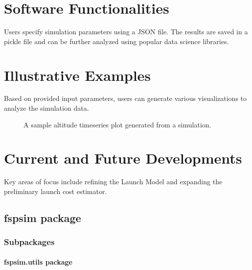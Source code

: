\documentclass[letterpaper,10pt,english]{sphinxmanual}
\begin{document}
\chapter{Software Functionalities}
\label{\detokenize{index:software-functionalities}}
\sphinxAtStartPar
Users specify simulation parameters using a JSON file. The results are saved in a pickle file and can be further analyzed using popular data science libraries.


\chapter{Illustrative Examples}
\label{\detokenize{index:illustrative-examples}}
\sphinxAtStartPar
Based on provided input parameters, users can generate various visualizations to analyze the simulation data.

\begin{figure}[htbp]
\centering
\capstart

\noindent{}
\caption{A sample altitude time\sphinxhyphen{}series plot generated from a simulation.}\label{\detokenize{index:id2}}\end{figure}


\chapter{Current and Future Developments}
\label{\detokenize{index:current-and-future-developments}}
\sphinxAtStartPar
Key areas of focus include refining the Launch Model and expanding the preliminary launch cost estimator.

\sphinxstepscope


\section{fspsim package}
\label{\detokenize{fspsim:fspsim-package}}\label{\detokenize{fspsim::doc}}

\subsection{Subpackages}
\label{\detokenize{fspsim:subpackages}}
\sphinxstepscope


\subsubsection{fspsim.utils package}
\label{\detokenize{fspsim.utils:fspsim-utils-package}}\label{\detokenize{fspsim.utils::doc}}
\end{document}
